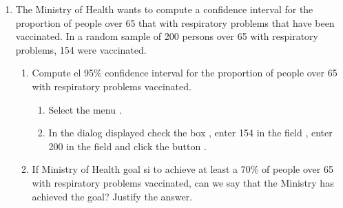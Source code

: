 \begin{enumerate}[leftmargin=*]
\item The Ministry of Health wants to compute a confidence interval for the proportion of people over 65 that
with respiratory problems that have been vaccinated. 
In a random sample of 200 persons over 65 with respiratory problems, 154 were vaccinated.  
\begin{enumerate}
\item Compute el 95\% confidence interval for the proportion of people over 65 with respiratory problems vaccinated.
\begin{indication}
\begin{enumerate}
\item Select the menu .
\item In the dialog displayed check the box , enter 154 in the field
, enter 200 in the field  and click the button .
\end{enumerate}
\end{indication}

\item If Ministry of Health goal si to achieve at least a 70\% of people over 65 with respiratory problems
vaccinated, can we say that the Ministry has achieved the goal?
Justify the answer.
\end{enumerate}
\end{enumerate}


